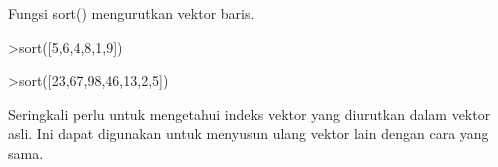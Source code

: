 \documentclass[a4paper,10pt]{article}
\begin{document}
\begin{eulernotebook}
\begin{eulercomment}
\begin{eulercomment}
\begin{eulercomment}
\begin{eulercomment}
\begin{eulercomment}
\begin{eulercomment}
\begin{eulercomment}
Fungsi sort() mengurutkan vektor baris.
\end{eulercomment}
\begin{eulerprompt}
>sort([5,6,4,8,1,9])
\end{eulerprompt}
\begin{euleroutput}
  [1,  4,  5,  6,  8,  9]
\end{euleroutput}
\begin{eulerprompt}
>sort([23,67,98,46,13,2,5])
\end{eulerprompt}
\begin{euleroutput}
  [2,  5,  13,  23,  46,  67,  98]
\end{euleroutput}
\begin{eulercomment}
Seringkali perlu untuk mengetahui indeks vektor yang diurutkan dalam
vektor asli. Ini dapat digunakan untuk menyusun ulang vektor lain
dengan cara yang sama.


\end{eulercomment}
\end{eulercomment}
\end{eulercomment}
\end{eulercomment}
\end{eulercomment}
\end{eulercomment}
\end{eulercomment}
\end{eulernotebook}
\end{document}
